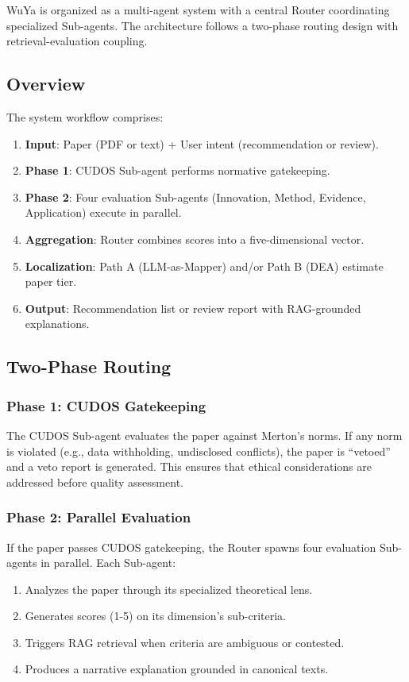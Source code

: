 \documentclass[11pt,a4paper]{article}
\begin{document}
WuYa is organized as a multi-agent system with a central Router coordinating specialized Sub-agents. The architecture follows a two-phase routing design with retrieval-evaluation coupling.

\subsection{Overview}

The system workflow comprises:
\begin{enumerate}
    \item \textbf{Input}: Paper (PDF or text) + User intent (recommendation or review).
    \item \textbf{Phase 1}: CUDOS Sub-agent performs normative gatekeeping.
    \item \textbf{Phase 2}: Four evaluation Sub-agents (Innovation, Method, Evidence, Application) execute in parallel.
    \item \textbf{Aggregation}: Router combines scores into a five-dimensional vector.
    \item \textbf{Localization}: Path A (LLM-as-Mapper) and/or Path B (DEA) estimate paper tier.
    \item \textbf{Output}: Recommendation list or review report with RAG-grounded explanations.
\end{enumerate}

\subsection{Two-Phase Routing}

\subsubsection{Phase 1: CUDOS Gatekeeping}

The CUDOS Sub-agent evaluates the paper against Merton's norms. If any norm is violated (e.g., data withholding, undisclosed conflicts), the paper is ``vetoed'' and a veto report is generated. This ensures that ethical considerations are addressed before quality assessment.

\subsubsection{Phase 2: Parallel Evaluation}

If the paper passes CUDOS gatekeeping, the Router spawns four evaluation Sub-agents in parallel. Each Sub-agent:
\begin{enumerate}
    \item Analyzes the paper through its specialized theoretical lens.
    \item Generates scores (1-5) on its dimension's sub-criteria.
    \item Triggers RAG retrieval when criteria are ambiguous or contested.
    \item Produces a narrative explanation grounded in canonical texts.
\end{enumerate}
\end{document}
